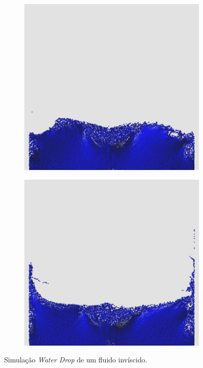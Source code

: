 \documentclass[12pt,a4paper,dvipsnames]{article}
\begin{document}
\begin{figure}[!h]
\begin{subfigure}[!h]{0.3\textwidth}
	\end{subfigure}
	\begin{subfigure}[!h]{0.3\textwidth} \centering
		\includegraphics[width=\textwidth]{WD/WD-11.jpg}
	\end{subfigure}
	\begin{subfigure}[!h]{0.3\textwidth} \centering
		\includegraphics[width=\textwidth]{WD/WD-12.jpg}
	\end{subfigure}
    \caption{Simulação \textit{Water Drop} de um fluido invíscido.}
    \label{fig:waterdrop}
\end{figure}
\end{document}
